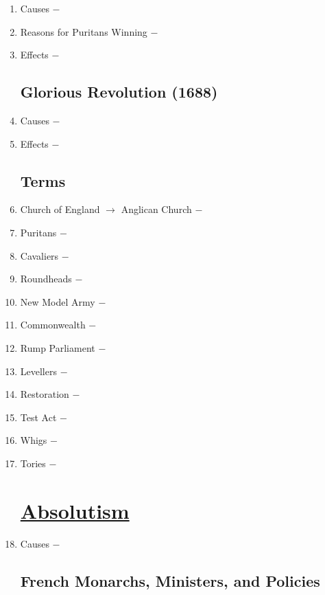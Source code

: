 \documentclass[12pt]{article}
\begin{document}
\begin{enumerate}
\item Causes $-$ 

\item Reasons for Puritans Winning $-$ 

\item Effects $-$

\subsection{Glorious Revolution (1688)}

\item Causes $-$

\item Effects $-$

\subsection{Terms}

\item Church of England $\rightarrow$ Anglican Church $-$

\item Puritans $-$ 

\item Cavaliers $-$ 

\item Roundheads $-$ 

\item New Model Army $-$ 

\item Commonwealth $-$ 

\item Rump Parliament $-$ 

\item Levellers $-$ 

\item Restoration $-$ 

\item Test Act $-$ 

\item Whigs $-$ 

\item Tories $-$ 

\section{\underline{Absolutism}}

\item Causes $-$ 

\subsection{French Monarchs, Ministers, and Policies}


\end{enumerate}
\end{document}
